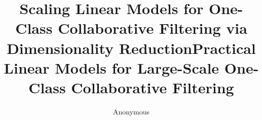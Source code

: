 \documentclass{article}
\begin{document}








\title{Scaling Linear Models for One-Class Collaborative Filtering via Dimensionality Reduction}
\title{Practical Linear Models for Large-Scale One-Class Collaborative Filtering}

\author{Anonymous}
\end{document}
